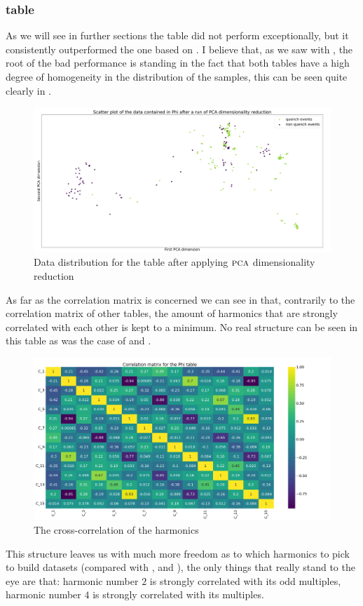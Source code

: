 \subsubsection{\phin table}
As we will see in further sections the \phin table did not perform exceptionally, but it consistently
outperformed the one based on \bn. I believe that, as we saw with \bn, the root of the bad performance
is standing in the fact that both tables have a high degree of homogeneity in the distribution of
the samples, this can be seen quite clearly in .

\begin{figure}[h!]
	\centering
	\includegraphics[width=\linewidth]{img/Phi_distribution.png}
	\caption{Data distribution for the \phin table after applying $\textsc{pca}$ dimensionality
		reduction} \label{fig:phi-dist}
\end{figure}

\medskip

As far as the correlation matrix is concerned we can see in  that, contrarily to
the correlation matrix of other tables, the amount of harmonics that are strongly correlated with
each other is kept to a minimum. No real structure can be seen in this table as was the case of \an
and \bn.
\begin{figure}[h!]
	\centering
	\includegraphics[width=\linewidth]{img/Phi_corr_matrix.png}
	\caption{The cross-correlation of the \phin harmonics} \label{fig:phi-corr}
\end{figure}
This structure leaves us with much more freedom as to which harmonics to pick to build datasets
(compared with \an, \bn and \cnmod), the only things that really stand to the eye are that: harmonic
number $2$ is strongly correlated with its odd multiples, harmonic number $4$ is strongly correlated
with its multiples.

